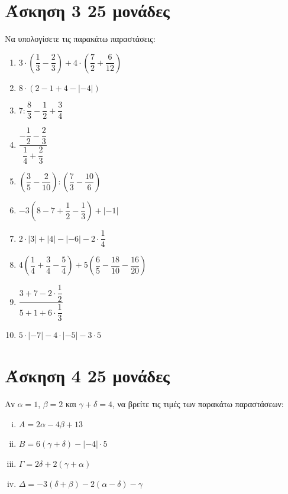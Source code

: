 \documentclass[a4paper,10pt]{report}
\begin{document}
\section*{Άσκηση 3  \hfill \small{} 25 μονάδες}
Να υπολογίσετε τις παρακάτω παραστάσεις:
\begin{enumerate}[1)]
 \item $3\cdot (\dfrac{1}{3}-\dfrac{2}{3})+4\cdot(\dfrac{7}{2}+\dfrac{6}{12})$
 \item $8\cdot (2-1+4-|-4|)$
 \item $7:\dfrac{8}{3}-\dfrac{1}{2}+\dfrac{3}{4}$
 \item $\dfrac{-\dfrac{1}{2}-\dfrac{2}{3}}{\dfrac{1}{4}+\dfrac{2}{3}}$
 \item $(\dfrac{3}{5}-\dfrac{2}{10}):(\dfrac{7}{3}-\dfrac{10}{6})$
 \item $-3(8-7+\dfrac{1}{2}-\dfrac{1}{3})+|-1|$
 \item $2\cdot |3|+|4|-|-6|-2\cdot \dfrac{1}{4}$
 \item $4(\dfrac{1}{4}+\dfrac{3}{4}-\dfrac{5}{4})+5(\dfrac{6}{5}-\dfrac{18}{10}-\dfrac{16}{20})$
 \item $\dfrac{3+7-2\cdot \dfrac{1}{2}}{5+1+6\cdot \dfrac{1}{3}}$
 \item $5\cdot|-7|-4\cdot|-5|-3\cdot5$
\end{enumerate}



\section*{Άσκηση 4  \hfill \small{} 25 μονάδες}
Αν $α=1$, $β=2$ και $γ+δ=4$, να βρείτε τις τιμές των παρακάτω παραστάσεων:
\begin{enumerate}[i)]
 \item $Α=2α-4β+13$
 \item $Β=6(γ+δ)-|-4|\cdot 5$
 \item $Γ=2δ+2(γ+α)$
 \item $Δ=-3(δ+β)-2(α-δ)-γ$
\end{enumerate}


 









\end{document}
